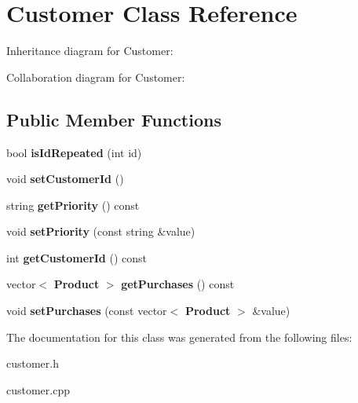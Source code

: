 \section{Customer Class Reference}
\label{class_customer}


Inheritance diagram for Customer\+:


Collaboration diagram for Customer\+:
\subsection*{Public Member Functions}
\begin{DoxyCompactItemize}
\item 
\mbox{\label{class_customer_add7e48d9ee5c115ad4b14dbecb45d751}} 
bool {\bfseries is\+Id\+Repeated} (int id)
\item 
\mbox{\label{class_customer_a04dc82673b719cf09f34f72d6f721fd1}} 
void {\bfseries set\+Customer\+Id} ()
\item 
\mbox{\label{class_customer_a1428d165068cc36d0c173930675187b9}} 
string {\bfseries get\+Priority} () const
\item 
\mbox{\label{class_customer_a217089747448a71703ca4a81ab1579ae}} 
void {\bfseries set\+Priority} (const string \&value)
\item 
\mbox{\label{class_customer_a4aafd79305fc4ab084e2a26ef014bbf3}} 
int {\bfseries get\+Customer\+Id} () const
\item 
\mbox{\label{class_customer_a165072d16ded3b450039e8b9dda3ae7b}} 
vector$<$ \textbf{ Product} $>$ {\bfseries get\+Purchases} () const
\item 
\mbox{\label{class_customer_ac31abe120090011f7192eaea90304f2b}} 
void {\bfseries set\+Purchases} (const vector$<$ \textbf{ Product} $>$ \&value)
\end{DoxyCompactItemize}


The documentation for this class was generated from the following files\+:\begin{DoxyCompactItemize}
\item 
customer.\+h\item 
customer.\+cpp\end{DoxyCompactItemize}
